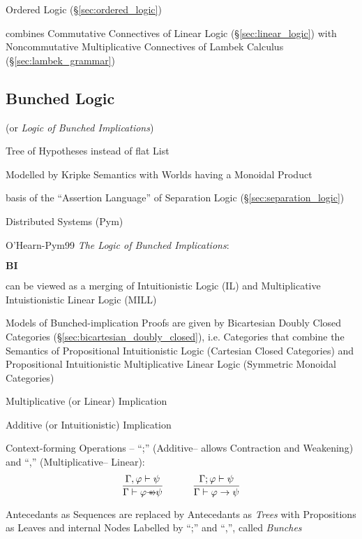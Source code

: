 \fist Ordered Logic (\S\ref{sec:ordered_logic})

combines Commutative Connectives of Linear Logic
(\S\ref{sec:linear_logic}) with Noncommutative Multiplicative
Connectives of Lambek Calculus (\S\ref{sec:lambek_grammar})



\subsection{Bunched Logic}\label{sec:bunched_logic}

\begingroup

\newcommand{\implmult}{\mathrlap{\rightarrow}*}
\renewcommand{\Id}{\mathbf{I}}

(or \emph{Logic of Bunched Implications})

Tree of Hypotheses instead of flat List

Modelled by Kripke Semantics with Worlds having a Monoidal Product

basis of the ``Assertion Language'' of Separation Logic
(\S\ref{sec:separation_logic})

Distributed Systems (Pym)

O'Hearn-Pym99 \emph{The Logic of Bunched Implications}:

$\textbf{BI}$

can be viewed as a merging of Intuitionistic Logic (IL) and
Multiplicative Intuistionistic Linear Logic (MILL)

Models of Bunched-implication Proofs are given by Bicartesian Doubly
Closed Categories (\S\ref{sec:bicartesian_doubly_closed}), i.e.
Categories that combine the Semantics of Propositional Intuitionistic
Logic (Cartesian Closed Categories) and Propositional Intuitionistic
Multiplicative Linear Logic (Symmetric Monoidal Categories)

Multiplicative (or Linear) Implication

Additive (or Intuitionistic) Implication

Context-forming Operations -- ``;'' (Additive-- allows Contraction and
Weakening) and ``,'' (Multiplicative-- Linear):
\[
  \frac{\Gamma,\varphi \vdash \psi}
    {\Gamma \vdash \varphi \implmult \psi}
  \quad\quad\quad
  \frac{\Gamma;\varphi \vdash \psi}
    {\Gamma \vdash \varphi \rightarrow \psi}
\]

Antecedants as Sequences are replaced by Antecedants as \emph{Trees}
with Propositions as Leaves and internal Nodes Labelled by ``;'' and
``,'', called \emph{Bunches}

